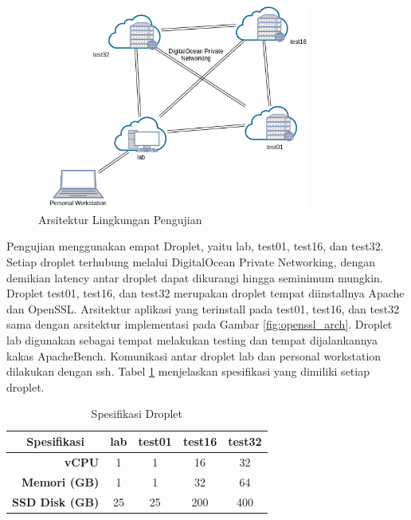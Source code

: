       \begin{figure}[h]
        \centering
        \includegraphics[width=0.8\textwidth]{resources/img/ch-4/testing_arch.png}
        \caption{Arsitektur Lingkungan Pengujian}
        \label{fig:testing_arch}
      \end{figure}

      Pengujian menggunakan empat Droplet, yaitu lab, test01, test16, dan test32. Setiap droplet terhubung melalui DigitalOcean Private Networking, dengan demikian latency antar droplet dapat dikurangi hingga seminimum mungkin. Droplet test01, test16, dan test32 merupakan droplet tempat diinstallnya Apache dan OpenSSL. Arsitektur aplikasi yang terinstall pada test01, test16, dan test32 sama dengan arsitektur implementasi pada Gambar \ref{fig:openssl_arch}. Droplet lab digunakan sebagai tempat melakukan testing dan tempat dijalankannya kakas ApacheBench. Komunikasi antar droplet lab dan personal workstation dilakukan dengan ssh. Tabel \ref{tab:droplet_specs} menjelaskan spesifikasi yang dimiliki setiap droplet.

      \begin{table}[]
        \caption{Spesifikasi Droplet} %
        \label{tab:droplet_specs}
        \centering %
        \begin{tabular}{@{}rcccc@{}}
          \toprule
          \multicolumn{1}{c}{\textbf{Spesifikasi}} & \textbf{lab} & \textbf{test01} & \textbf{test16} & \textbf{test32} \\ \midrule
          \textbf{vCPU}                            & 1            & 1               & 16              & 32              \\
          \textbf{Memori (GB)}                     & 1            & 1               & 32              & 64              \\
          \textbf{SSD Disk (GB)}                   & 25           & 25              & 200             & 400             \\ \bottomrule
        \end{tabular}
      \end{table}


